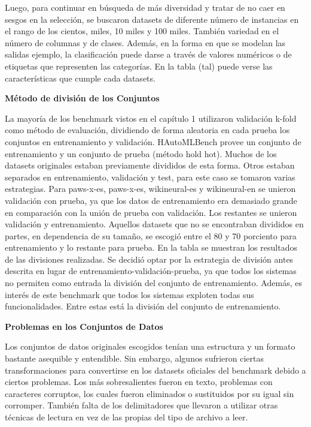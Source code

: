 Luego, para continuar en búsqueda de más diversidad y tratar de no caer en sesgos en la selección, se buscaron datasets de diferente número de instancias en el rango 
de los cientos, miles, 10 miles y 100 miles. También variedad en el número de columnas y de clases. Además, en la forma en que se modelan las salidas ejemplo, la 
clasificación puede darse a través de valores numéricos o de etiquetas que representen las categorías. En la tabla (tal) puede verse las características que cumple 
cada datasets.
\begin{flushleft} 
    {\large { \textbf{Método de división de los Conjuntos}}}\label{section:division}
\end{flushleft}
La mayoría de los benchmark vistos en el capítulo 1 utilizaron validación k-fold como método de evaluación, dividiendo de forma 
aleatoria en cada prueba los conjuntos en entrenamiento y validación. HAutoMLBench provee un conjunto de entrenamiento y un conjunto de prueba (método hold hot). 
Muchos de los datasets originales estaban previamente divididos de esta forma. Otros estaban separados en entrenamiento, validación y test, para este caso se 
tomaron varias estrategias. Para paws-x-es, paws-x-es, wikineural-es y wikineural-en se unieron validación con prueba, ya que los datos de entrenamiento era 
demasiado grande en comparación con la unión de prueba con validación. Los restantes se unieron validación y entrenamiento. Aquellos datasets que no se encontraban 
divididos en partes, en dependencia de su tamaño, se escogió entre el 80 y 70 porciento para entrenamiento y lo restante para prueba. En la tabla se muestran 
los resultados de las divisiones realizadas. Se decidió optar por la estrategia de división antes descrita en lugar de entrenamiento-validación-prueba, ya que 
todos los sistemas no permiten como entrada la división del conjunto de entrenamiento. Además, es interés de este benchmark que todos los sistemas exploten todas sus 
funcionalidades. Entre estas está la división del conjunto de entrenamiento.

\begin{flushleft} 
    {\large { \textbf{Problemas en los Conjuntos de Datos}}}\label{section:dataproblems}
\end{flushleft}
Los conjuntos de datos originales escogidos tenían una estructura y un formato bastante asequible y entendible. Sin embargo, algunos sufrieron ciertas transformaciones 
para convertirse en los datasets oficiales del benchmark debido a ciertos problemas. Los más sobresalientes fueron en texto, 
problemas con caracteres corruptos, los cuales fueron eliminados o sustituidos por su igual sin corromper. También falta de los delimitadores que llevaron a utilizar 
otras técnicas de lectura en vez de las propias del tipo de archivo a leer.


